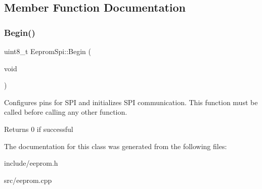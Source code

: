 \subsection{Member Function Documentation}
\mbox{\label{classEepromSpi_a73b7f850103cacbcefbab5c7422a8928}} 
\subsubsection{\texorpdfstring{Begin()}{Begin()}}
{\footnotesize\ttfamily uint8\+\_\+t Eeprom\+Spi\+::\+Begin (\begin{DoxyParamCaption}\item[{void}]{ }\end{DoxyParamCaption})}

Configures pins for S\+PI and initializes S\+PI communication. This function must be called before calling any other function. \begin{DoxyReturn}{Returns}
0 if successful 
\end{DoxyReturn}


The documentation for this class was generated from the following files\+:\begin{DoxyCompactItemize}
\item 
include/eeprom.\+h\item 
src/eeprom.\+cpp\end{DoxyCompactItemize}

